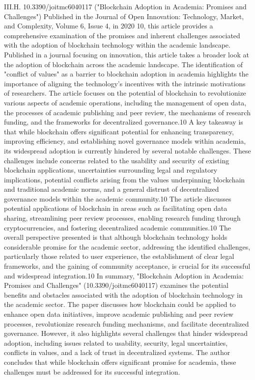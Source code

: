 \documentclass{article}
\begin{document}
III.H. 10.3390/joitmc6040117 ("Blockchain Adoption in Academia: Promises and Challenges")
Published in the Journal of Open Innovation: Technology, Market, and Complexity, Volume 6, Issue 4, in 2020 10, this article provides a comprehensive examination of the promises and inherent challenges associated with the adoption of blockchain technology within the academic landscape. Published in a journal focusing on innovation, this article takes a broader look at the adoption of blockchain across the academic landscape. The identification of "conflict of values" as a barrier to blockchain adoption in academia highlights the importance of aligning the technology's incentives with the intrinsic motivations of researchers. The article focuses on the potential of blockchain to revolutionize various aspects of academic operations, including the management of open data, the processes of academic publishing and peer review, the mechanisms of research funding, and the frameworks for decentralized governance.10 A key takeaway is that while blockchain offers significant potential for enhancing transparency, improving efficiency, and establishing novel governance models within academia, its widespread adoption is currently hindered by several notable challenges. These challenges include concerns related to the usability and security of existing blockchain applications, uncertainties surrounding legal and regulatory implications, potential conflicts arising from the values underpinning blockchain and traditional academic norms, and a general distrust of decentralized governance models within the academic community.10 The article discusses potential applications of blockchain in areas such as facilitating open data sharing, streamlining peer review processes, enabling research funding through cryptocurrencies, and fostering decentralized academic communities.10 The overall perspective presented is that although blockchain technology holds considerable promise for the academic sector, addressing the identified challenges, particularly those related to user experience, the establishment of clear legal frameworks, and the gaining of community acceptance, is crucial for its successful and widespread integration.10
In summary, "Blockchain Adoption in Academia: Promises and Challenges" (10.3390/joitmc6040117) examines the potential benefits and obstacles associated with the adoption of blockchain technology in the academic sector. The paper discusses how blockchain could be applied to enhance open data initiatives, improve academic publishing and peer review processes, revolutionize research funding mechanisms, and facilitate decentralized governance. However, it also highlights several challenges that hinder widespread adoption, including issues related to usability, security, legal uncertainties, conflicts in values, and a lack of trust in decentralized systems. The author concludes that while blockchain offers significant promise for academia, these challenges must be addressed for its successful integration.
\end{document}
